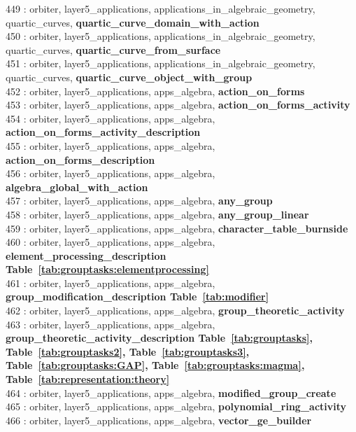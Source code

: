 449 : orbiter, layer5\_applications, applications\_in\_algebraic\_geometry, quartic\_curves, {\bf quartic\_curve\_domain\_with\_action}\\
450 : orbiter, layer5\_applications, applications\_in\_algebraic\_geometry, quartic\_curves, {\bf quartic\_curve\_from\_surface}\\
451 : orbiter, layer5\_applications, applications\_in\_algebraic\_geometry, quartic\_curves, {\bf quartic\_curve\_object\_with\_group}\\
452 : orbiter, layer5\_applications, apps\_algebra, {\bf action\_on\_forms}\\
453 : orbiter, layer5\_applications, apps\_algebra, {\bf action\_on\_forms\_activity}\\
454 : orbiter, layer5\_applications, apps\_algebra, {\bf action\_on\_forms\_activity\_description}\\
455 : orbiter, layer5\_applications, apps\_algebra, {\bf action\_on\_forms\_description}\\
456 : orbiter, layer5\_applications, apps\_algebra, {\bf algebra\_global\_with\_action}\\
457 : orbiter, layer5\_applications, apps\_algebra, {\bf any\_group}\\
458 : orbiter, layer5\_applications, apps\_algebra, {\bf any\_group\_linear}\\
459 : orbiter, layer5\_applications, apps\_algebra, {\bf character\_table\_burnside}\\
460 : orbiter, layer5\_applications, apps\_algebra, {\bf element\_processing\_description Table~\ref{tab:grouptasks:elementprocessing}}\\
461 : orbiter, layer5\_applications, apps\_algebra, {\bf group\_modification\_description Table~\ref{tab:modifier}}\\
462 : orbiter, layer5\_applications, apps\_algebra, {\bf group\_theoretic\_activity}\\
463 : orbiter, layer5\_applications, apps\_algebra, {\bf group\_theoretic\_activity\_description Table~\ref{tab:grouptasks},  Table~\ref{tab:grouptasks2},  Table~\ref{tab:grouptasks3},  Table~\ref{tab:grouptasks:GAP},  Table~\ref{tab:grouptasks:magma},  Table~\ref{tab:representation:theory}}\\
464 : orbiter, layer5\_applications, apps\_algebra, {\bf modified\_group\_create}\\
465 : orbiter, layer5\_applications, apps\_algebra, {\bf polynomial\_ring\_activity}\\
466 : orbiter, layer5\_applications, apps\_algebra, {\bf vector\_ge\_builder}\\
